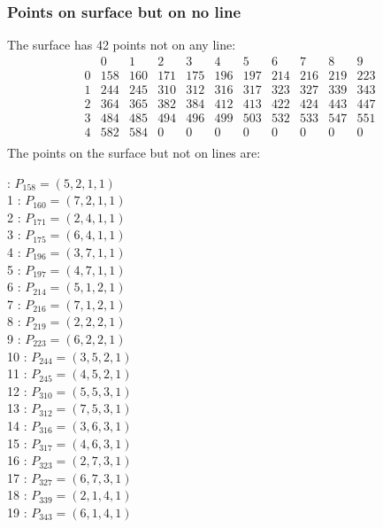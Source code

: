 \documentclass{article}
\begin{document}
{\subsubsection*{Points on surface but on no line}
The surface has 42 points not on any line:\\
$$
\begin{array}{r|*{10}{r}}
 & 0 & 1 & 2 & 3 & 4 & 5 & 6 & 7 & 8 & 9\\
\hline
0 & 158 & 160 & 171 & 175 & 196 & 197 & 214 & 216 & 219 & 223\\
1 & 244 & 245 & 310 & 312 & 316 & 317 & 323 & 327 & 339 & 343\\
2 & 364 & 365 & 382 & 384 & 412 & 413 & 422 & 424 & 443 & 447\\
3 & 484 & 485 & 494 & 496 & 499 & 503 & 532 & 533 & 547 & 551\\
4 & 582 & 584 & 0 & 0 & 0 & 0 & 0 & 0 & 0 & 0\\
\end{array}
$$
The points on the surface but not on lines are:\\
\begin{multicols}{2}
 : $P_{158}=( 5, 2, 1, 1 )$\\
1 : $P_{160}=( 7, 2, 1, 1 )$\\
2 : $P_{171}=( 2, 4, 1, 1 )$\\
3 : $P_{175}=( 6, 4, 1, 1 )$\\
4 : $P_{196}=( 3, 7, 1, 1 )$\\
5 : $P_{197}=( 4, 7, 1, 1 )$\\
6 : $P_{214}=( 5, 1, 2, 1 )$\\
7 : $P_{216}=( 7, 1, 2, 1 )$\\
8 : $P_{219}=( 2, 2, 2, 1 )$\\
9 : $P_{223}=( 6, 2, 2, 1 )$\\
10 : $P_{244}=( 3, 5, 2, 1 )$\\
11 : $P_{245}=( 4, 5, 2, 1 )$\\
12 : $P_{310}=( 5, 5, 3, 1 )$\\
13 : $P_{312}=( 7, 5, 3, 1 )$\\
14 : $P_{316}=( 3, 6, 3, 1 )$\\
15 : $P_{317}=( 4, 6, 3, 1 )$\\
16 : $P_{323}=( 2, 7, 3, 1 )$\\
17 : $P_{327}=( 6, 7, 3, 1 )$\\
18 : $P_{339}=( 2, 1, 4, 1 )$\\
19 : $P_{343}=( 6, 1, 4, 1 )$\\

\end{multicols}}
\end{document}
